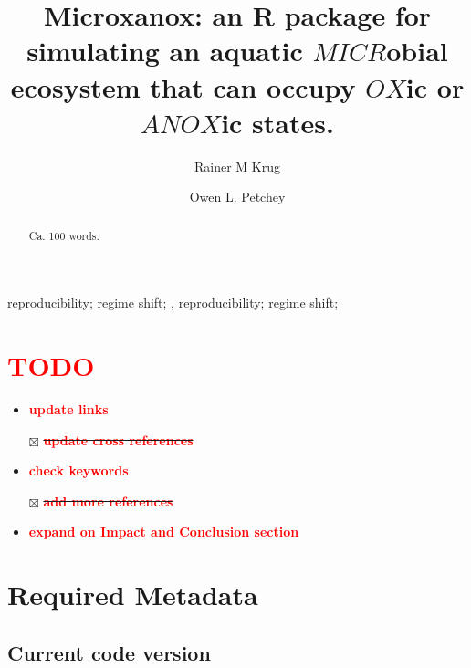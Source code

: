 \documentclass[]{elsarticle} %
\providecommand{\tightlist}{%
  \setlength{\itemsep}{0pt}\setlength{\parskip}{0pt}}
\begin{document}
\begin{frontmatter}

  \title{Microxanox: an R package for simulating an aquatic
\(MICR\)obial ecosystem that can occupy \(OX\)ic or \(ANOX\)ic states.}
    \author[University of Zürich]{Rainer M Krug%
  }
    \author[University of Zürich]{Owen L. Petchey}
  
  \begin{abstract}
  Ca. 100 words.
  \end{abstract}
    \begin{keyword}
    reproducibility; regime shift; \sep 
    reproducibility; regime shift;
  \end{keyword}
  
 \end{frontmatter}

\hypertarget{section}{%
\section{\texorpdfstring{\textcolor{red}{TODO}}{}}\label{section}}

\begin{itemize}
\tightlist
\item
  \textbf{\textcolor{red}{update links}}
\item[$\boxtimes$]
  \sout{\textbf{\textcolor{red}{update cross references}}}
\item
  \textbf{\textcolor{red}{check keywords}}
\item[$\boxtimes$]
  \sout{\textbf{\textcolor{red}{add more references}}}
\item
  \textbf{\textcolor{red}{expand on Impact and Conclusion section}}
  \pagebreak
\end{itemize}

\hypertarget{required-metadata}{%
\section{Required Metadata}\label{required-metadata}}

\hypertarget{current-code-version}{%
\subsection{Current code version}\label{current-code-version}}
\end{document}

